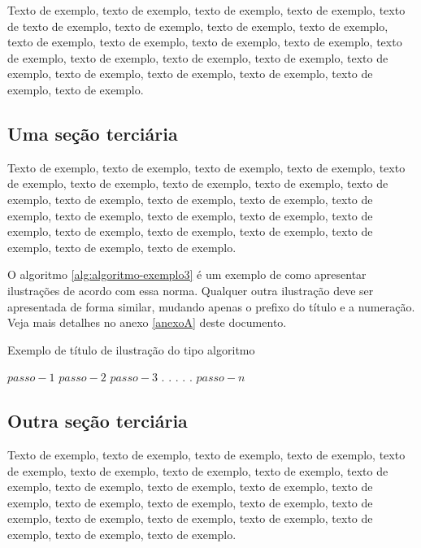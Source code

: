 \documentclass[
	12pt,				%
	oneside,			%
	a4paper,			%
	english,			%
	brazil				%
	]{abntex2ppgsi}
\begin{document}
Texto de exemplo, texto de exemplo, texto de exemplo, texto de exemplo, texto de texto de exemplo, texto de exemplo, texto de exemplo, texto de exemplo, texto de exemplo, texto de exemplo, texto de exemplo, texto de exemplo, texto de exemplo, texto de exemplo, texto de exemplo, texto de exemplo, texto de exemplo, texto de exemplo, texto de exemplo, texto de exemplo, texto de exemplo, texto de exemplo.

\subsection{Uma seção terciária}

Texto de exemplo, texto de exemplo, texto de exemplo, texto de exemplo, texto de exemplo, texto de exemplo, texto de exemplo, texto de exemplo, texto de exemplo, texto de exemplo, texto de exemplo, texto de exemplo, texto de exemplo, texto de exemplo, texto de exemplo, texto de exemplo, texto de exemplo, texto de exemplo, texto de exemplo, texto de exemplo, texto de exemplo, texto de exemplo, texto de exemplo.

O algoritmo \ref{alg:algoritmo-exemplo3} é um exemplo de como apresentar ilustrações de acordo com essa norma. Qualquer outra ilustração deve ser apresentada de forma similar, mudando apenas o prefixo do título e a numeração. Veja mais detalhes no anexo \ref{anexoA} deste documento.

\begin{algorithm}[htbp]
\caption{Exemplo de título de ilustração do tipo algoritmo}
\label{alg:algoritmo-exemplo3}
\begin{algorithmic}[1]
\State $passo-1$
\State $passo-2$
\State $passo-3$
\State $.$
\State $.$
\State $.$
\State $.$
\State $.$
\State $passo-n$
\EndProcedure
\end{algorithmic}
\end{algorithm}


\subsection{Outra seção terciária}

Texto de exemplo, texto de exemplo, texto de exemplo, texto de exemplo, texto de exemplo, texto de exemplo, texto de exemplo, texto de exemplo, texto de exemplo, texto de exemplo, texto de exemplo, texto de exemplo, texto de exemplo, texto de exemplo, texto de exemplo, texto de exemplo, texto de exemplo, texto de exemplo, texto de exemplo, texto de exemplo, texto de exemplo, texto de exemplo, texto de exemplo.
\end{document}
